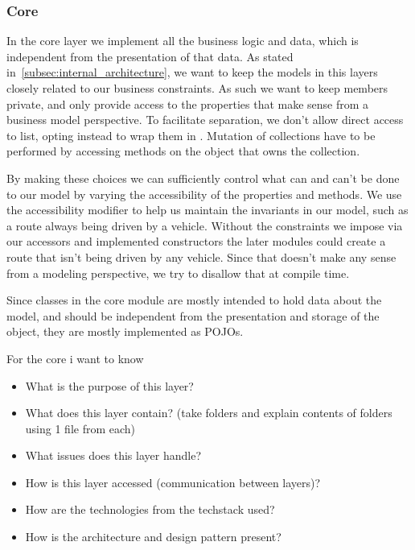\subsubsection{Core}
In the core layer we implement all the business logic and data, which is
independent from the presentation of that data. As stated in~\ref{subsec:internal_architecture},
we want to keep the models in this layers closely related to our business
constraints. As such we want to keep members private, and only provide access to
the properties that make sense from a business model perspective. To facilitate
separation, we don't allow direct access to list, opting instead to wrap them in
. Mutation of collections have to be performed by
accessing methods on the object that owns the collection.

By making these choices we can sufficiently control what can and can't be done
to our model by varying the accessibility of the properties and methods. We use
the accessibility modifier to help us maintain the invariants in our model, such
as a route always being driven by a vehicle. Without the constraints we impose
via our accessors and implemented constructors the later modules could create
a route that isn't being driven by any vehicle. Since that doesn't make any
sense from a modeling perspective, we try to disallow that at compile time.

Since classes in the core module are mostly intended to hold data about the
model, and should be independent from the presentation and storage of the
object, they are mostly implemented as POJOs.


For the core i want to know
\begin{itemize}
    \item What is the purpose of this layer?
    \item What does this layer contain? (take folders and explain contents of folders using 1 file from each)
    \item What issues does this layer handle?
    \item How is this layer accessed (communication between layers)?
    \item How are the technologies from the techstack used?
    \item How is the architecture and design pattern present?
\end{itemize}
